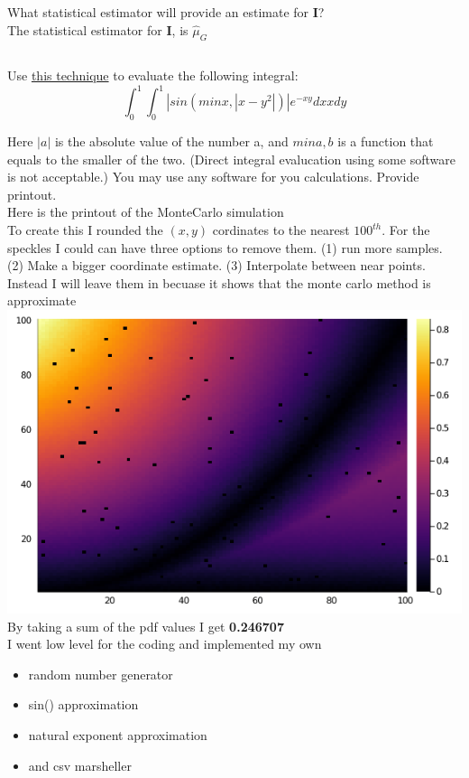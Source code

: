 \documentclass[12pt, letterpaper]{article}
\begin{document}
\subsection{}
What statistical estimator will provide an estimate for $\textbf{I}$?
\\
The statistical estimator for $\textbf{I}$, is $\hat{\mu}_G$
\subsection{}
Use \underline{this technique} to evaluate the following integral:
\[
	\int_{0}^{1} \int_{0}^{1} |sin(min{x,|x-y^2|})|e^{-xy} dxxdy
\]

Here $|a|$ is the absolute value of the number a, and $min{a, b}$ is a function
that equals to the smaller of the two. (Direct integral evalucation using some
software is not acceptable.)
You may use any software for you calculations. Provide printout.
\\
Here is the printout of the MonteCarlo simulation
\\
To create this I rounded the $(x, y)$ cordinates to the nearest $100^{th}$.
For the speckles I could can have three options to remove them. (1) run more samples.
(2) Make a bigger coordinate estimate. (3) Interpolate between near points.\\
Instead I will leave them in becuase it shows that the monte carlo method is approximate
\\
\includegraphics[scale=.5]{heatmap.png}
\\
By taking a sum of the pdf values I get \textbf{0.246707}
\\
I went low level for the coding and implemented my own
\begin{itemize}
	\item random number generator
	\item sin() approximation
	\item natural exponent approximation
	\item and csv marsheller
\end{itemize}
\end{document}
